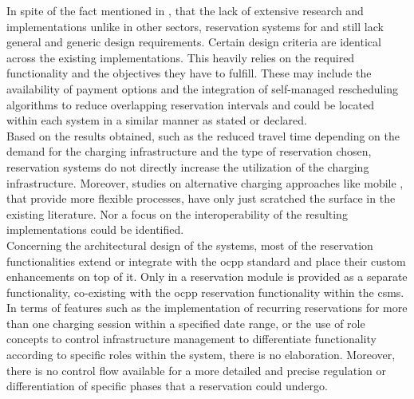 \noindent In spite of the fact mentioned in \cite{basmadjian_interoperable_2019}, that the lack of extensive research and implementations unlike in other sectors, reservation systems for  and  still lack general and generic design requirements.
Certain design criteria are identical across the existing implementations. This heavily relies on the required functionality and the objectives they have to fulfill.
These may include the availability of payment options and the integration of self-managed rescheduling algorithms to reduce overlapping reservation intervals and could be located within each system in a similar manner as stated or declared. \\
\noindent Based on the results obtained, such as the reduced travel time depending on the demand for the charging infrastructure and the type of reservation chosen, reservation systems do not directly increase the utilization of the charging infrastructure.
Moreover, studies on alternative charging approaches like mobile , that provide more flexible processes, have only just scratched the surface in the existing literature. Nor a focus on the interoperability of the resulting implementations could be identified. \\
\noindent Concerning the architectural design of the systems, most of the reservation functionalities extend or integrate with the \acrshort{ocpp} standard and place their custom enhancements on top of it. Only in \cite{flocea_electric_2022} a reservation module is provided as a separate functionality, co-existing with the \acrshort{ocpp} reservation functionality within the \acrshort{csms}.
In terms of features such as the implementation of recurring reservations for more than one charging session within a specified date range, or the use of role concepts to control infrastructure management to differentiate functionality according to specific roles within the system, there is no elaboration.
Moreover, there is no control flow available for a more detailed and precise regulation or differentiation of specific phases that a reservation could undergo. 
